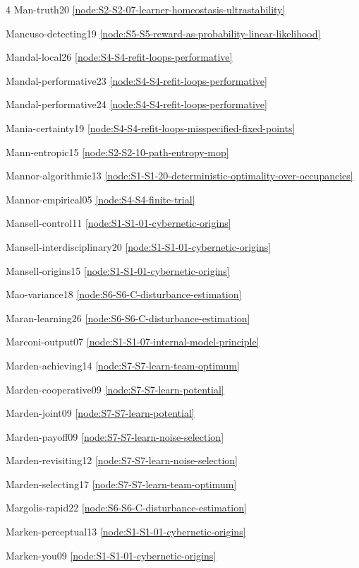 \documentclass[10pt]{article}
\begin{document}
{\begin{multicols}{4}
Man-truth20 \hfill \ref{node:S2-S2-07-learner-homeostasis-ultrastability}\par
Mancuso-detecting19 \hfill \ref{node:S5-S5-reward-as-probability-linear-likelihood}\par
Mandal-local26 \hfill \ref{node:S4-S4-refit-loops-performative}\par
Mandal-performative23 \hfill \ref{node:S4-S4-refit-loops-performative}\par
Mandal-performative24 \hfill \ref{node:S4-S4-refit-loops-performative}\par
Mania-certainty19 \hfill \ref{node:S4-S4-refit-loops-misspecified-fixed-points}\par
Mann-entropic15 \hfill \ref{node:S2-S2-10-path-entropy-mop}\par
Mannor-algorithmic13 \hfill \ref{node:S1-S1-20-deterministic-optimality-over-occupancies}\par
Mannor-empirical05 \hfill \ref{node:S4-S4-finite-trial}\par
Mansell-control11 \hfill \ref{node:S1-S1-01-cybernetic-origins}\par
Mansell-interdisciplinary20 \hfill \ref{node:S1-S1-01-cybernetic-origins}\par
Mansell-origins15 \hfill \ref{node:S1-S1-01-cybernetic-origins}\par
Mao-variance18 \hfill \ref{node:S6-S6-C-disturbance-estimation}\par
Maran-learning26 \hfill \ref{node:S6-S6-C-disturbance-estimation}\par
Marconi-output07 \hfill \ref{node:S1-S1-07-internal-model-principle}\par
Marden-achieving14 \hfill \ref{node:S7-S7-learn-team-optimum}\par
Marden-cooperative09 \hfill \ref{node:S7-S7-learn-potential}\par
Marden-joint09 \hfill \ref{node:S7-S7-learn-potential}\par
Marden-payoff09 \hfill \ref{node:S7-S7-learn-noise-selection}\par
Marden-revisiting12 \hfill \ref{node:S7-S7-learn-noise-selection}\par
Marden-selecting17 \hfill \ref{node:S7-S7-learn-team-optimum}\par
Margolis-rapid22 \hfill \ref{node:S6-S6-C-disturbance-estimation}\par
Marken-perceptual13 \hfill \ref{node:S1-S1-01-cybernetic-origins}\par
Marken-you09 \hfill \ref{node:S1-S1-01-cybernetic-origins}\par

\end{multicols}}
\end{document}
